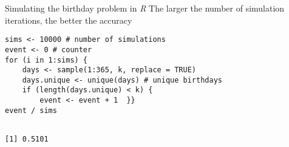 \documentclass[presentation]{beamer}
\begin{document}
\begin{frame}[fragile,label={sec:org711d7e9}]{Simulating the birthday problem in \emph{R}}
 The larger the number of simulation iterations, the better the accuracy
\begin{verbatim}
sims <- 10000 # number of simulations
event <- 0 # counter
for (i in 1:sims) {
    days <- sample(1:365, k, replace = TRUE)
    days.unique <- unique(days) # unique birthdays
    if (length(days.unique) < k) {
        event <- event + 1  }}
event / sims
\end{verbatim}

\begin{verbatim}

[1] 0.5101
\end{verbatim}
\end{frame}
\end{document}
